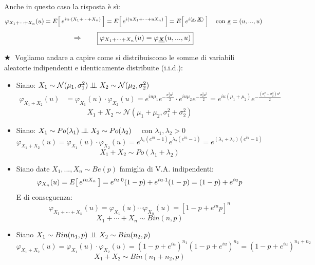 \medskip
\noindent Anche in questo caso la risposta è sì:
\[\varphi_{X_1+\cdots+X_n}(u) = E\!\left[\,e^{iu\cdot(X_1+\cdots+X_n)}\,\right] = E\!\left[\,e^{i(uX_1 + \cdots + uX_n)}\,\right] = E\!\left[\,e^{i\left\langle \underline{{\boldsymbol{s}}},\, \underline{{\boldsymbol{X}}} \right\rangle}\,\right] \quad \text{con }\underline{{\boldsymbol{s}}} = (u, ..., u)\]
\[\Rightarrow\qquad \boxed{\varphi_{X_1+\cdots+X_n}(u) = \varphi_{\underline{{\boldsymbol{X}}}}(u, ..., u)}\]

\noindent \(\bigstar \;\) Vogliamo andare a capire come si distribuiscono le somme di variabili aleatorie indipendenti e identicamente distribuite (i.i.d.):

\begin{itemize}
    \item Siano: $X_1\sim\mathcal{N}(\mu_1, \sigma^2_1) \mathrel{\perp\!\!\!\perp} X_2\sim\mathcal{N}(\mu_2, \sigma^2_2)$
    \begin{align*}
        \varphi_{X_1+X_2}(u) & = \varphi_{X_1}(u)\cdot \varphi_{X_2}(u) = e^{iu\mu_1} e^{-\frac{\sigma_1^2 u^2}{2}}\cdot e^{iu\mu_2} e^{-\frac{\sigma^2_2 u^2}{2}} = e^{iu(\mu_1+\mu_2)} e^{-\frac{(\sigma^2_1+\sigma_2^2) u^2}{2}}
    \end{align*}
    \[\boxed{X_1+X_2 \sim \mathcal{N}(\mu_1+\mu_2, \sigma^2_1+\sigma_2^2)}\]
    
    \item Siano: $X_1\sim Po(\lambda_1) \mathrel{\perp\!\!\!\perp} X_2\sim Po(\lambda_2)\quad $ con $\lambda_1, \lambda_2>0$
    \[\varphi_{X_1+X_2}(u) = \varphi_{X_1}(u)\cdot \varphi_{X_2}(u) = e^{\lambda_1(e^{iu}-1)} e^{\lambda_2(e^{iu}-1)} = e^{(\lambda_1+\lambda_2)(e^{iu}-1)}\]
    \[\boxed{X_1+X_2\sim Po(\lambda_1+\lambda_2)}\]

    \item Siano date $X_1, ..., X_n\sim Be(p)$ famiglia di V.A. indipendenti:
    \[\varphi_{X_n}(u) = E\!\left[\,e^{iuX_n}\,\right] = e^{iu\cdot0} (1-p) + e^{iu\cdot 1}(1-p) = (1-p) + e^{iu}p\]
    E di conseguenza:
    \[\varphi_{X_1+\cdots + X_n}(u) = \varphi_{X_1}(u)\cdots \varphi_{X_n}(u) = \left[1-p+e^{iu}p\right]^n\]
    \[\boxed{X_1+\cdots+X_n \sim Bin(n, p)}\]

    \item Siano $X_1\sim Bin(n_1, p) \mathrel{\perp\!\!\!\perp} X_2\sim Bin(n_2, p)$
    \[\varphi_{X_1+X_2}(u) = \varphi_{X_1}(u)\cdot \varphi_{X_2}(u) = \left(1-p+e^{iu}\right)^{n_1} \left(1-p+e^{iu}\right)^{n_2} = \left(1-p+e^{iu}\right)^{n_1+n_2}\]
    \[\boxed{X_1+X_2\sim Bin(n_1+n_2, p)}\]
\end{itemize}